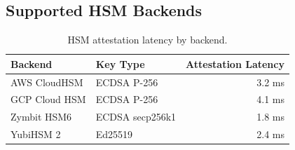 \subsection{Supported HSM Backends}

\begin{table}[h]
\centering
\begin{tabular}{llr}
\toprule
\textbf{Backend} & \textbf{Key Type} & \textbf{Attestation Latency} \\
\midrule
AWS CloudHSM & ECDSA P-256 & 3.2 ms \\
GCP Cloud HSM & ECDSA P-256 & 4.1 ms \\
Zymbit HSM6 & ECDSA secp256k1 & 1.8 ms \\
YubiHSM 2 & Ed25519 & 2.4 ms \\
\bottomrule
\end{tabular}
\caption{HSM attestation latency by backend.}
\label{tab:hsm}
\end{table}

